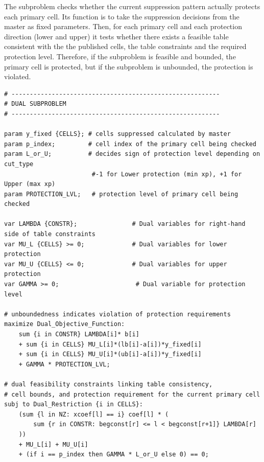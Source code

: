 \documentclass[11pt,a4paper]{article}
\begin{document}
The subproblem checks whether the current suppression pattern actually protects each primary cell.
Its function is to take the suppression decisions from the master as fixed parameters.
Then, for each primary cell and each protection direction (lower and upper)
it tests whether there exists a feasible table consistent with the the published cells, the table constraints and the required protection level.
Therefore, if the subproblem is feasible and bounded, the primary cell is protected, but if the subproblem is unbounded, the protection is violated.
\begin{lstlisting}
# ---------------------------------------------------------
# DUAL SUBPROBLEM 
# ---------------------------------------------------------

param y_fixed {CELLS}; # cells suppressed calculated by master 
param p_index;         # cell index of the primary cell being checked
param L_or_U;          # decides sign of protection level depending on cut_type
						#-1 for Lower protection (min xp), +1 for Upper (max xp)
param PROTECTION_LVL;	# protection level of primary cell being checked

var LAMBDA {CONSTR};               # Dual variables for right-hand side of table constraints
var MU_L {CELLS} >= 0;             # Dual variables for lower protection
var MU_U {CELLS} <= 0;             # Dual variables for upper protection
var GAMMA >= 0;						# Dual variable for protection level

# unboundedness indicates violation of protection requirements
maximize Dual_Objective_Function:
    sum {i in CONSTR} LAMBDA[i]* b[i]
    + sum {i in CELLS} MU_L[i]*(lb[i]-a[i])*y_fixed[i]
    + sum {i in CELLS} MU_U[i]*(ub[i]-a[i])*y_fixed[i]
    + GAMMA * PROTECTION_LVL;

# dual feasibility constraints linking table consistency,
# cell bounds, and protection requirement for the current primary cell
subj to Dual_Restriction {i in CELLS}:
    (sum {l in NZ: xcoef[l] == i} coef[l] * (
        sum {r in CONSTR: begconst[r] <= l < begconst[r+1]} LAMBDA[r]
    ))
    + MU_L[i] + MU_U[i] 
    + (if i == p_index then GAMMA * L_or_U else 0) == 0;

\end{lstlisting}
\end{document}
